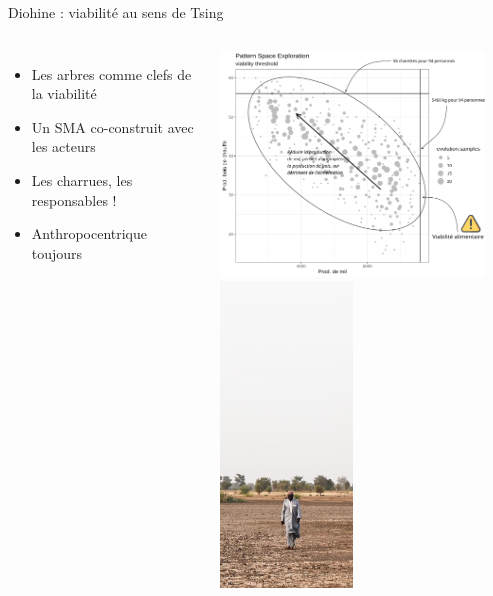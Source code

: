 \documentclass[newPxFont]{beamer}
\begin{document}
\begin{frame}[c]{Diohine : viabilité au sens de Tsing}
  \vspace{-1cm}
  \begin{columns}[onlytextwidth,T]
    \column{\dimexpr\linewidth-30mm-5mm}
        \begin{itemize}
          \item Les arbres comme clefs de la viabilité
          \item Un SMA co-construit avec les acteurs
          \item Les charrues, les responsables !
          \item Anthropocentrique toujours
        \end{itemize}
        \includegraphics[width=7cm]{img/pse.png}
    \column{30mm}
    \vspace{0.5cm}
          \includegraphics[width=3.5cm]{img/diohine.jpg}
  \end{columns}
\end{frame}
\end{document}
